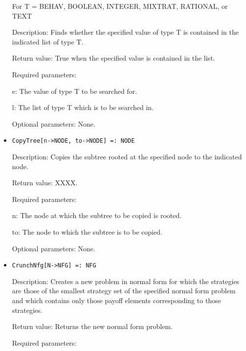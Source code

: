 \begin{itemize}
For T = BEHAV, BOOLEAN, INTEGER, MIXTRAT, RATIONAL, or TEXT

\bd
\item
[Description:] Finds whether the specified value of type T is
contained in the indicated list of type T.
\item 
[Return value:] True when the specified value is contained in the
list.
\item
[Required parameters:]\hfil\null
	
\bd
\item	
[e:] The value of type T to be searched for.
\item
[l:] The list of type T which is to be searched in.
\ed

\item
[Optional parameters:] None.
\ed

\item

\protect \large \begin{verbatim}
CopyTree[n->NODE, to->NODE] =: NODE
\end{verbatim}\normalsize

\bd
\item
[Description:] Copies the subtree rooted at the specified node to the
indicated node.
\item
[Return value:] XXXX.
\item
[Required parameters:]\hfil\null

\bd
\item	
[n:] The node at which the subtree to be copied is rooted.
\item
[to:] The node to which the subtree is to be copied.
\ed

\item
[Optional parameters:] None.
\ed

\item
\protect \large \begin{verbatim}
CrunchNfg[N->NFG] =: NFG
\end{verbatim}\normalsize

\bd
\item
[Description:] Creates a new problem in normal form for which the
strategies are those of the smallest strategy set of the specified
normal form problem and which contains only those payoff elements
corresponding to those strategies.
\item
[Return value:] Returns the new normal form problem.
\item
[Required parameters:]\hfil\null
	

\end{itemize}
